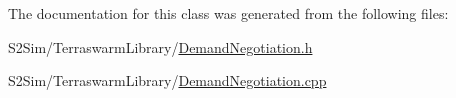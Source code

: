 The documentation for this class was generated from the following files\-:\begin{DoxyCompactItemize}
\item 
S2\-Sim/\-Terraswarm\-Library/\hyperlink{_demand_negotiation_8h}{Demand\-Negotiation.\-h}\item 
S2\-Sim/\-Terraswarm\-Library/\hyperlink{_demand_negotiation_8cpp}{Demand\-Negotiation.\-cpp}\end{DoxyCompactItemize}
